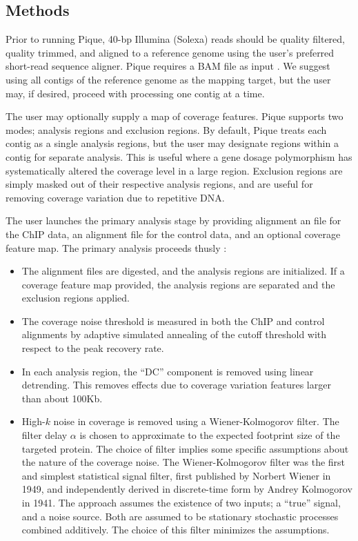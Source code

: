 \documentclass{bioinfo} %
\begin{document}
\begin{methods} \section{Methods}

\noindent Prior to running Pique, 40-bp Illumina (Solexa) reads should
be quality filtered, quality trimmed, and aligned to a reference genome
using the user's preferred short-read sequence aligner. Pique requires a
BAM file as input \cite{sam_format}. We suggest using all contigs of the
reference genome as the mapping target, but the user may, if desired,
proceed with processing one contig at a time.

The user may optionally supply a map of coverage features. Pique
supports two modes; analysis regions and exclusion regions. By default,
Pique treats each contig as a single analysis regions, but the user may
designate regions within a contig for separate analysis. This is useful
where a gene dosage polymorphism has systematically altered the coverage
level in a large region. Exclusion regions are simply masked out of
their respective analysis regions, and are useful for removing coverage
variation due to repetitive DNA.

The user launches the primary analysis stage by providing alignment an
file for the ChIP data, an alignment file for the control data, and an
optional coverage feature map. The primary analysis proceeds thusly :

\begin{itemize}

\item The alignment files are digested, and the analysis regions are
initialized. If a coverage feature map provided, the analysis regions
are separated and the exclusion regions applied.

\item The coverage noise threshold is measured in both the ChIP and
control alignments by adaptive simulated annealing of the cutoff
threshold with respect to the peak recovery rate.

\item In each analysis region, the ``DC'' component is removed using
linear detrending. This removes effects due to coverage variation
features larger than about 100Kb.

\item High-$k$ noise in coverage is removed using a Wiener-Kolmogorov
filter. The filter delay $\alpha$ is chosen to approximate to the
expected footprint size of the targeted protein. The choice of filter
implies some specific assumptions about the nature of the coverage
noise. The Wiener-Kolmogorov filter was the first and simplest
statistical signal filter, first published by Norbert Wiener in 1949,
and independently derived in discrete-time form by Andrey Kolmogorov in
1941. The approach assumes the existence of two inputs; a ``true''
signal, and a noise source. Both are assumed to be stationary stochastic
processes combined additively. The choice of this filter minimizes the
assumptions.


\end{itemize}
\end{methods}
\end{document}
